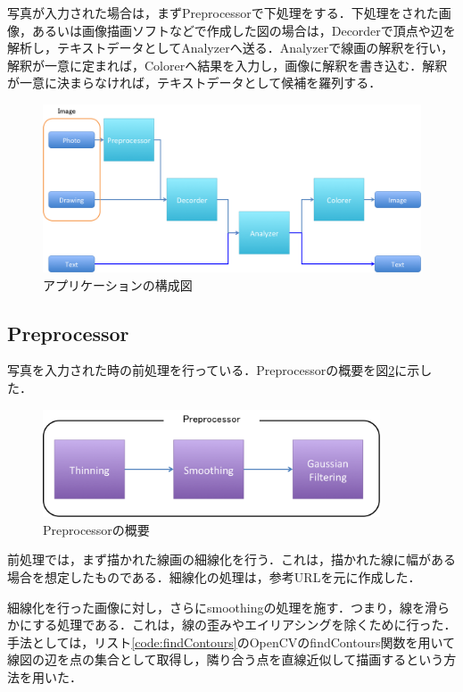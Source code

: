 \documentclass{jarticle}
\begin{document}
写真が入力された場合は，まずPreprocessorで下処理をする．下処理をされた画像，あるいは画像描画ソフトなどで作成した図の場合は，Decorderで頂点や辺を解析し，テキストデータとしてAnalyzerへ送る．Analyzerで線画の解釈を行い，解釈が一意に定まれば，Colorerへ結果を入力し，画像に解釈を書き込む．解釈が一意に決まらなければ，テキストデータとして候補を羅列する．
\begin{figure}[H]
\begin{center}
\includegraphics[width=180mm]{image/composition.png}
\caption{アプリケーションの構成図}
\label{fig:composition}
\end{center}
\end{figure}


\subsection{Preprocessor}
写真を入力された時の前処理を行っている．Preprocessorの概要を図\ref{fig:preprocessor}に示した．
\begin{figure}[H]
\begin{center}
\includegraphics[width=100mm]{image/preprocessor.png}
\caption{Preprocessorの概要}
\label{fig:preprocessor}
\end{center}
\end{figure}


前処理では，まず描かれた線画の細線化を行う．これは，描かれた線に幅がある場合を想定したものである．細線化の処理は，参考URL\cite{ref:thinning}を元に作成した．

細線化を行った画像に対し，さらにsmoothingの処理を施す．つまり，線を滑らかにする処理である．これは，線の歪みやエイリアシングを除くために行った．手法としては，リスト\ref{code:findContours}のOpenCVのfindContours関数を用いて線図の辺を点の集合として取得し，隣り合う点を直線近似して描画するという方法を用いた．
\lstset{style=customjava}

\end{document}
